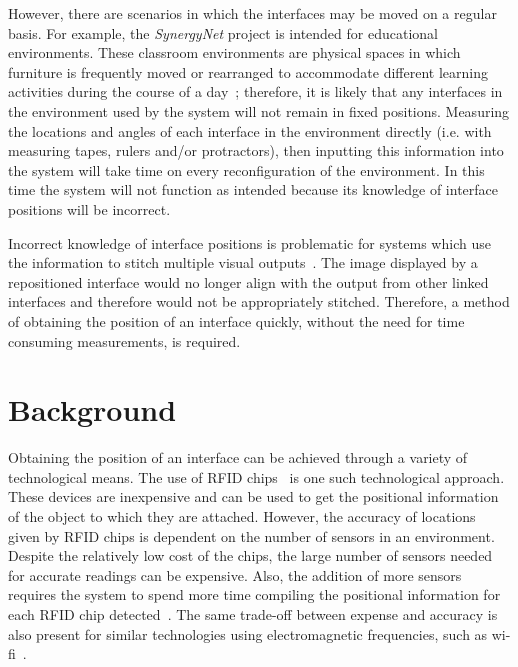 \documentclass{bmcart}
\begin{document}
However, there are scenarios in which the interfaces may be moved on a regular basis.
For example, the {\emph{SynergyNet}} project is intended for educational environments.
These classroom environments are physical spaces in which furniture is frequently moved or rearranged to accommodate different learning activities during the course of a day~\cite{Tiburcio2005}; therefore, it is likely that any interfaces in the environment used by the system will not remain in fixed positions.
Measuring the locations and angles of each interface in the environment directly (i.e. with measuring tapes, rulers and/or protractors), then inputting this information into the system will take time on every reconfiguration of the environment.
In this time the system will not function as intended because its knowledge of interface positions will be incorrect.

Incorrect knowledge of interface positions is problematic for systems which use the information to stitch multiple visual outputs~\cite{Dietz2004,Jones2011}.
The image displayed by a repositioned interface would no longer align with the output from other linked interfaces and therefore would not be appropriately stitched. Therefore, a method of obtaining the position of an interface quickly, without the need for time consuming measurements, is required.


\section*{Background}\label{sec:related}

Obtaining the position of an interface can be achieved through a variety of technological means.
The use of RFID chips~\cite{Ni2004} is one such technological approach.
These devices are inexpensive and can be used to get the positional information of the object to which they are attached.
However, the accuracy of locations given by RFID chips is dependent on the number of sensors in an environment.
Despite the relatively low cost of the chips, the large number of sensors needed for accurate readings can be expensive.
Also, the addition of more sensors requires the system to spend more time compiling the positional information for each RFID chip detected~\cite{Ni2004}.
The same trade-off between expense and accuracy is also present for similar technologies using electromagnetic frequencies, such as wi-fi~\cite{Cheng2005}.
\end{document}
